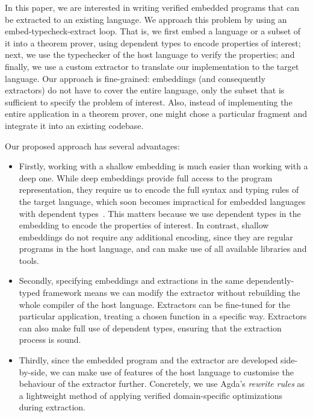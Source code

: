 \documentclass[acmsmall,review,anonymous]{acmart}\settopmatter{printfolios=true,printccs=false,printacmref=false}
\begin{document}
In this paper, we are interested in writing verified embedded programs
that can be extracted to an existing language.  We approach this problem by
using an embed-typecheck-extract loop.  That is, we first embed a
language or a subset of it into a theorem prover, using dependent
types to encode properties of interest; next, we use the typechecker of
the host language to verify the properties; and finally, we use a
custom extractor to translate our implementation to the target
language.
%
Our approach is fine-grained: embeddings
(and consequently extractors) do not have to cover the entire
language, only the subset that is sufficient to specify the problem of
interest.  Also, instead of implementing the entire application in a
theorem prover, one might chose a particular fragment and integrate it
into an existing codebase.

Our proposed approach has several advantages:
\begin{itemize}
  \item Firstly, working with a shallow embedding is much easier than
  working with a deep one.  While deep embeddings provide full access
  to the program representation, they require us to encode the full
  syntax and typing rules of the target language,
  which soon becomes impractical for embedded languages with dependent
  types~\cite{10.1145/1863495.1863497}. This matters because we use
  dependent types in the embedding to encode the properties of
  interest.
  In contrast, shallow embeddings do not require any additional
  encoding, since they are regular programs in the host language, and
  can make use of all available libraries and tools.

  \item Secondly, specifying embeddings and extractions in the same
  dependently-typed framework means we can modify the extractor
  without rebuilding the whole compiler of the host language.
  Extractors can be fine-tuned for the particular application, \eg{}
  treating a chosen function in a specific way.  Extractors can also make
  full use of dependent types, ensuring that the extraction process is
  sound.

  \item Thirdly, since the embedded program and the extractor are
  developed side-by-side, we can make use of features of the host
  language to customise the behaviour of the extractor
  further. Concretely, we use Agda's \emph{rewrite rules} as a
  lightweight method of applying verified domain-specific
  optimizations during extraction.
\end{itemize}
\end{document}
